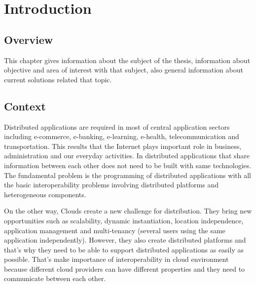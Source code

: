 
\chapter{Introduction}
\label{chapter:introduction}
\section{Overview}
\label{section:overview}
This chapter gives information about the subject of the thesis, information about objective and area of interest with that subject, also general information about current solutions related that topic.

\section{Context}
\label{section:context}

Distributed applications are required in most of central application sectors including e-commerce, e-banking, e-learning, e-health, telecommunication and transportation\citep{thesis:introduction1}. This results that the Internet plays important role in business, administration and our everyday activities. In distributed applications that share information between each other does not need to be built with same technologies. The fundamental problem is the programming of distributed applications with all the basic interoperability problems involving distributed platforms and heterogeneous components.

On the other way, Clouds create a new challenge for distribution. They bring new opportunities such as scalability, dynamic instantiation, location independence, application management and multi-tenancy (several users using the same application independently)\citep{thesis:introduction2}. However, they also create distributed platforms and that’s why they need to be able to support distributed applications as easily as possible. That's make importance of interoperability in cloud environment because different cloud providers can have different properties and they need to communicate between each other.

